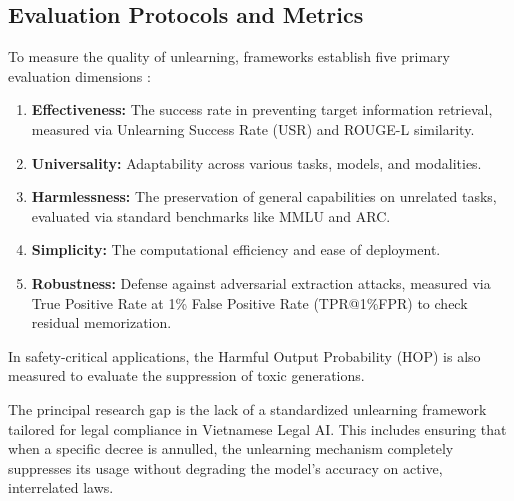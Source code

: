 \subsection{Evaluation Protocols and Metrics}
To measure the quality of unlearning, frameworks establish five primary evaluation dimensions \parencite{11207222}:
\begin{enumerate}
    \item \textbf{Effectiveness:} The success rate in preventing target information retrieval, measured via Unlearning Success Rate (USR) and ROUGE-L similarity.
    \item \textbf{Universality:} Adaptability across various tasks, models, and modalities.
    \item \textbf{Harmlessness:} The preservation of general capabilities on unrelated tasks, evaluated via standard benchmarks like MMLU and ARC.
    \item \textbf{Simplicity:} The computational efficiency and ease of deployment.
    \item \textbf{Robustness:} Defense against adversarial extraction attacks, measured via True Positive Rate at 1\% False Positive Rate (TPR@1\%FPR) to check residual memorization.
\end{enumerate}
In safety-critical applications, the Harmful Output Probability (HOP) is also measured to evaluate the suppression of toxic generations.

The principal research gap is the lack of a standardized unlearning framework tailored for legal compliance in Vietnamese Legal AI. This includes ensuring that when a specific decree is annulled, the unlearning mechanism completely suppresses its usage without degrading the model's accuracy on active, interrelated laws.
